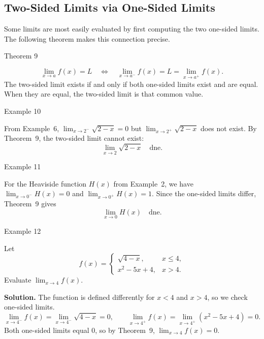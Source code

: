 \bigskip


\subsection*{Two-Sided Limits via One-Sided Limits}
\label{subsec:1.2.2}


Some limits are most easily evaluated by first computing the two one-sided limits. The following theorem makes this connection precise.


\begin{theorembox}{Theorem 9}

\[
\lim_{x \to a} f(x) = L \quad\iff\quad \lim_{x \to a^{-}} f(x) = L = \lim_{x \to a^{+}} f(x).
\]
The two-sided limit exists if and only if both one-sided limits exist and are equal. When they are equal, the two-sided limit is that common value.
\end{theorembox}


\begin{examplebox}{Example 10}

From Example~6, \(\displaystyle\lim_{x \to 2^{-}} \sqrt{2 - x} = 0\) but \(\displaystyle\lim_{x \to 2^{+}} \sqrt{2 - x}\) does not exist. By Theorem~9, the two-sided limit cannot exist:
\[
\lim_{x \to 2} \sqrt{2 - x} \quad \text{dne}.
\]
\end{examplebox}


\begin{examplebox}{Example 11}

For the Heaviside function \(H(x)\) from Example~2, we have \(\lim_{x \to 0^{-}} H(x) = 0\) and \(\lim_{x \to 0^{+}} H(x) = 1\). Since the one-sided limits differ, Theorem~9 gives
\[
\lim_{x \to 0} H(x) \quad \text{dne}.
\]
\end{examplebox}


\begin{examplebox}{Example 12}

Let
\[
f(x) = \begin{cases}
\sqrt{4 - x},   & x \le 4, \\[4pt]
x^{2} - 5x + 4, & x > 4.
\end{cases}
\]
Evaluate \(\displaystyle\lim_{x \to 4} f(x)\).

\medskip
\textbf{Solution.}
The function is defined differently for \(x < 4\) and \(x > 4\), so we check one-sided limits.
\[
\lim_{x \to 4^{-}} f(x) = \lim_{x \to 4^{-}} \sqrt{4 - x} = 0,
\qquad
\lim_{x \to 4^{+}} f(x) = \lim_{x \to 4^{+}} (x^{2} - 5x + 4) = 0.
\]
Both one-sided limits equal 0, so by Theorem~9, \(\displaystyle\lim_{x \to 4} f(x) = 0\).
\end{examplebox}


